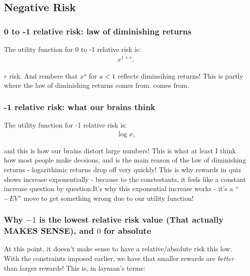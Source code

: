 \documentclass{beamer}
\begin{document}
    \subsection{Negative Risk}
    \begin{frame}\frametitle{0 to -1 relative risk: law of diminishing returns}
        \begin{theorem}
            The utility function for 0 to -1 relative risk is:
        \begin{align*}
            x^{1+r},
        \end{align*}
        \end{theorem} \pause
        $r$ risk. And rembere that $x^a$ for $a<1$ reflects diminsihing returns! This is partly where the law of diminishing returns comes from.
        comes from.
    \end{frame}
    \begin{frame}\frametitle{-1 relative risk: what our brains think}
        \begin{theorem}
            The utility function for -1 relative risk is:
        \begin{align*}
            \log x,
        \end{align*}
        \end{theorem} \pause
        and this is how our brains distort large numbers! This is what at least I think how most people make decsions,
        and is the main reason of the law of diminishing returns - logarithimic returns drop off very quickly! \pause This is why rewards 
        in quiz shows increase exponentially - because to the constestants, it feels like a constant increase question by question.\pause It's 
        why this exponential increase works - it's a ``$-EV$'' move to get something wrong due to our utility function!
    \end{frame}
    \begin{frame}\frametitle{Why $-1$ is the lowest relative risk value (That actually MAKES SENSE), and $0$ for absolute}
        At this point, it doesn't make sense to have a relative/absolute risk this low. With the constraints imposed earlier, we have that 
        smaller rewards are \textit{better} than larger rewards! This is, in layman's terms:
    \end{frame}
\end{document}
